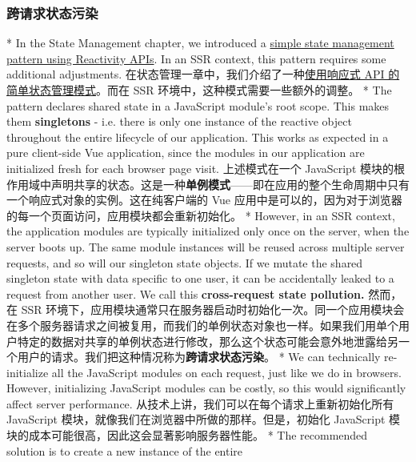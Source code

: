 \begin{paracol}{2}
\subsubsection{跨请求状态污染}
\switchcolumn[0]*%
In the State Management chapter, we introduced a
\href{https://vuejs.org/guide/scaling-up/state-management.html\#simple-state-management-with-reactivity-api}{simple
state management pattern using Reactivity APIs}. In an SSR context, this
pattern requires some additional adjustments.
\switchcolumn
在状态管理一章中，我们介绍了一种\href{https://cn.vuejs.org/guide/scaling-up/state-management.html\#simple-state-management-with-reactivity-api}{使用响应式
API 的简单状态管理模式}。而在 SSR 环境中，这种模式需要一些额外的调整。
\switchcolumn[0]*%
The pattern declares shared state in a JavaScript module's root scope.
This makes them \textbf{singletons} - i.e. there is only one instance of
the reactive object throughout the entire lifecycle of our application.
This works as expected in a pure client-side Vue application, since the
modules in our application are initialized fresh for each browser page
visit.
\switchcolumn
上述模式在一个 JavaScript
模块的根作用域中声明共享的状态。这是一种\textbf{单例模式}------即在应用的整个生命周期中只有一个响应式对象的实例。这在纯客户端的
Vue
应用中是可以的，因为对于浏览器的每一个页面访问，应用模块都会重新初始化。
\switchcolumn[0]*%
However, in an SSR context, the application modules are typically
initialized only once on the server, when the server boots up. The same
module instances will be reused across multiple server requests, and so
will our singleton state objects. If we mutate the shared singleton
state with data specific to one user, it can be accidentally leaked to a
request from another user. We call this \textbf{cross-request state
pollution.}
\switchcolumn
然而，在 SSR
环境下，应用模块通常只在服务器启动时初始化一次。同一个应用模块会在多个服务器请求之间被复用，而我们的单例状态对象也一样。如果我们用单个用户特定的数据对共享的单例状态进行修改，那么这个状态可能会意外地泄露给另一个用户的请求。我们把这种情况称为\textbf{跨请求状态污染}。
\switchcolumn[0]*%
We can technically re-initialize all the JavaScript modules on each
request, just like we do in browsers. However, initializing JavaScript
modules can be costly, so this would significantly affect server
performance.
\switchcolumn
从技术上讲，我们可以在每个请求上重新初始化所有 JavaScript
模块，就像我们在浏览器中所做的那样。但是，初始化 JavaScript
模块的成本可能很高，因此这会显著影响服务器性能。
\switchcolumn[0]*%
The recommended solution is to create a new instance of the entire

\end{paracol}
